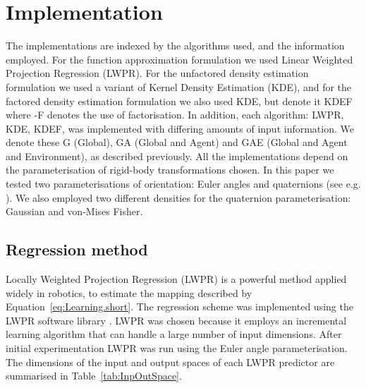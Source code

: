 \section{Implementation}\label{sec:Implementation}

\newcommand{\bx}{\mathbf{x}}
\newcommand{\by}{\mathbf{y}}

The implementations are indexed by the algorithms used, and the information employed. For the function approximation formulation we used Linear Weighted Projection Regression (LWPR). For the unfactored density estimation formulation we used a variant of Kernel Density Estimation (KDE), and for the factored density estimation formulation we also used KDE, but denote it KDEF where -F denotes the use of factorisation. In addition, each algorithm: LWPR, KDE, KDEF, was implemented with differing amounts of input information. We denote these G (Global), GA (Global and Agent) and GAE (Global and Agent and Environment), as described previously. All the implementations depend on the parameterisation of rigid-body transformations chosen. In this paper we tested two parameterisations of orientation: Euler angles and quaternions (see e.g. \citep{murray_mathematical_1994}). We also employed two different densities for the quaternion parameterisation: Gaussian and von-Mises Fisher.

\subsection{Regression method}\label{sec:Implementation.regression}

Locally Weighted Projection Regression (LWPR) \citep{vijayakumar_incremental_2005} is a powerful method applied widely in robotics, to estimate the mapping described by Equation~\eqref{eq:Learning.short}. The regression scheme was implemented using the LWPR software library \citep{klanke_library_2008}. LWPR was chosen because it employs an incremental learning algorithm that can handle a large number of input dimensions. After initial experimentation LWPR was run using the Euler angle parameterisation. The dimensions of the input and output spaces of each LWPR predictor are summarised in Table~\ref{tab:InpOutSpace}.



